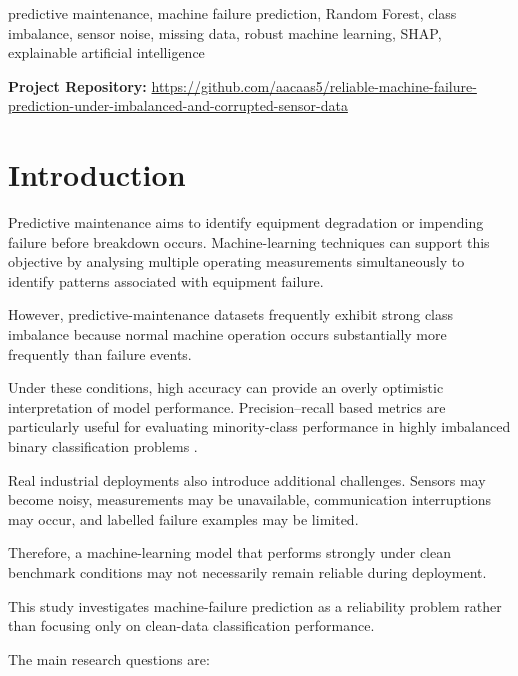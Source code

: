 \documentclass[conference]{IEEEtran}
\begin{document}
\begin{IEEEkeywords}
predictive maintenance, machine failure prediction, Random Forest, class imbalance, sensor noise, missing data, robust machine learning, SHAP, explainable artificial intelligence
\end{IEEEkeywords}

\noindent
\textbf{Project Repository:}
\url{https://github.com/aacaas5/reliable-machine-failure-prediction-under-imbalanced-and-corrupted-sensor-data}


\section{Introduction}

Predictive maintenance aims to identify equipment degradation or impending failure before breakdown occurs. Machine-learning techniques can support this objective by analysing multiple operating measurements simultaneously to identify patterns associated with equipment failure.

However, predictive-maintenance datasets frequently exhibit strong class imbalance because normal machine operation occurs substantially more frequently than failure events.

Under these conditions, high accuracy can provide an overly optimistic interpretation of model performance. Precision--recall based metrics are particularly useful for evaluating minority-class performance in highly imbalanced binary classification problems \cite{saito2015}.

Real industrial deployments also introduce additional challenges. Sensors may become noisy, measurements may be unavailable, communication interruptions may occur, and labelled failure examples may be limited.

Therefore, a machine-learning model that performs strongly under clean benchmark conditions may not necessarily remain reliable during deployment.

This study investigates machine-failure prediction as a reliability problem rather than focusing only on clean-data classification performance.

The main research questions are:
\end{document}
